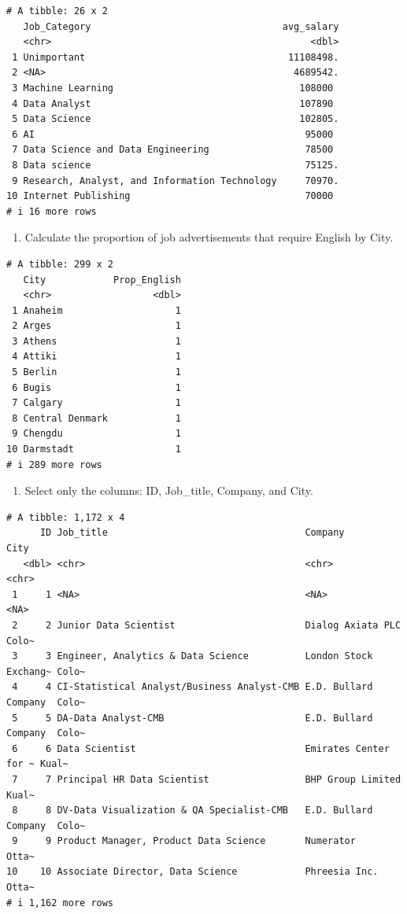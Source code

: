 \documentclass[
  letterpaper,
  DIV=11,
  numbers=noendperiod]{scrreprt}
\providecommand{\tightlist}{%
  \setlength{\itemsep}{0pt}\setlength{\parskip}{0pt}}\usepackage{longtable,booktabs,array}
\begin{document}
\begin{verbatim}
# A tibble: 26 x 2
   Job_Category                                  avg_salary
   <chr>                                              <dbl>
 1 Unimportant                                    11108498.
 2 <NA>                                            4689542.
 3 Machine Learning                                 108000 
 4 Data Analyst                                     107890 
 5 Data Science                                     102805.
 6 AI                                                95000 
 7 Data Science and Data Engineering                 78500 
 8 Data science                                      75125.
 9 Research, Analyst, and Information Technology     70970.
10 Internet Publishing                               70000 
# i 16 more rows
\end{verbatim}

\begin{enumerate}
\def\labelenumi{\arabic{enumi}.}
\setcounter{enumi}{4}
\tightlist
\item
  Calculate the proportion of job advertisements that require English by
  City.
\end{enumerate}

\begin{verbatim}
# A tibble: 299 x 2
   City            Prop_English
   <chr>                  <dbl>
 1 Anaheim                    1
 2 Arges                      1
 3 Athens                     1
 4 Attiki                     1
 5 Berlin                     1
 6 Bugis                      1
 7 Calgary                    1
 8 Central Denmark            1
 9 Chengdu                    1
10 Darmstadt                  1
# i 289 more rows
\end{verbatim}

\begin{enumerate}
\def\labelenumi{\arabic{enumi}.}
\setcounter{enumi}{5}
\tightlist
\item
  Select only the columns: ID, Job\_title, Company, and City.
\end{enumerate}

\begin{verbatim}
# A tibble: 1,172 x 4
      ID Job_title                                   Company               City 
   <dbl> <chr>                                       <chr>                 <chr>
 1     1 <NA>                                        <NA>                  <NA> 
 2     2 Junior Data Scientist                       Dialog Axiata PLC     Colo~
 3     3 Engineer, Analytics & Data Science          London Stock Exchang~ Colo~
 4     4 CI-Statistical Analyst/Business Analyst-CMB E.D. Bullard Company  Colo~
 5     5 DA-Data Analyst-CMB                         E.D. Bullard Company  Colo~
 6     6 Data Scientist                              Emirates Center for ~ Kual~
 7     7 Principal HR Data Scientist                 BHP Group Limited     Kual~
 8     8 DV-Data Visualization & QA Specialist-CMB   E.D. Bullard Company  Colo~
 9     9 Product Manager, Product Data Science       Numerator             Otta~
10    10 Associate Director, Data Science            Phreesia Inc.         Otta~
# i 1,162 more rows
\end{verbatim}
\end{document}
